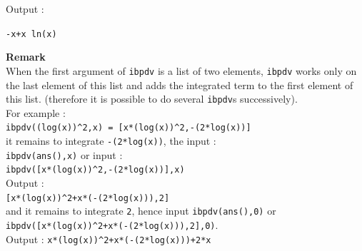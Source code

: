 \documentclass[a4paper,11pt]{book}
\begin{document}
Output :
\begin{center}{\tt -x+x ln(x)}\end{center}
{\bf Remark}\\
 When the first argument of {\tt ibpdv} is a list of two elements, {\tt ibpdv} 
works only on the last element of this list and adds the integrated term to
the first element of this list.  
(therefore it is possible to do several {\tt ibpdv}s successively).\\
For example :\\
{\tt ibpdv((log(x))\verb|^|2,x) = [x*(log(x))\verb|^|2,-(2*log(x))]}\\ 
it remains to integrate {\tt -(2*log(x))}, the input :\\
{\tt ibpdv(ans(),x)} or input :\\
{\tt ibpdv([x*(log(x))\verb|^|2,-(2*log(x))],x)}\\
Output :\\
{\tt [x*(log(x))\verb|^|2+x*(-(2*log(x))),2]}\\
and it remains to integrate {\tt 2}, hence input {\tt ibpdv(ans(),0)} or\\
{\tt ibpdv([x*(log(x))\verb|^|2+x*(-(2*log(x))),2],0)}.\\
Output :
{\tt x*(log(x))\verb|^|2+x*(-(2*log(x)))+2*x}
\end{document}
